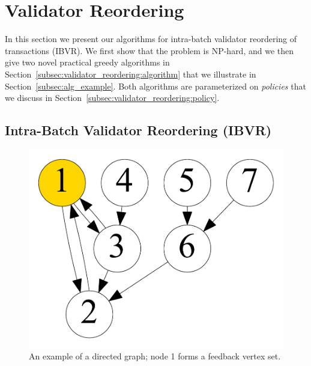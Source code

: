 \section{Validator Reordering}\label{sec:validator_reordering}

In this section we present our algorithms for intra-batch validator reordering of transactions (IBVR). We first show that the problem is NP-hard, and we then give two novel practical greedy algorithms in Section~\ref{subsec:validator_reordering:algorithm} that we illustrate in Section~\ref{subsec:alg_example}. Both algorithms are parameterized on \emph{policies} that
we discuss in Section~\ref{subsec:validator_reordering:policy}.

\subsection{Intra-Batch Validator Reordering (IBVR)}\label{sec:ibvr}
\label{subsec:validator_reordering:algorithm}


\begin{figure}[t]
\centering
\includegraphics[width=0.3\columnwidth]{./alg_fig/fvs-eg}
\vspace{-1em}
\caption{An example of a directed graph; node 1 forms a feedback vertex set.}
\vspace{-1em}
\label{fig:fvs}
\end{figure}

